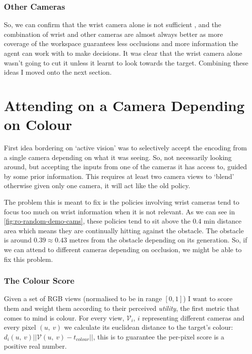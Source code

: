 \subsubsection{Other Cameras}
So, we can confirm that the wrist camera alone is not sufficient , and the combination of wrist and other cameras are almost always better as more coverage of the workspace guarantees less occlusions and more information the agent can work with to make decisions. It was clear that the wrist camera alone wasn't going to cut it unless it learnt to look towards the target. Combining these ideas I moved onto the next section.

\section{Attending on a Camera Depending on Colour}\label{sec:reach-obs-naive-cam-attn}
First idea bordering on `active vision' was to selectively accept the encoding from a single camera depending on what it was seeing. So, not necessarily looking around, but accepting the inputs from one of the cameras it has access to, guided by some prior information. This requires at least two camera views to `blend' otherwise given only one camera, it will act like the old policy.

The problem this is meant to fix is the policies involving wrist cameras tend to focus too much on wrist information when it is not relevant. As we can see in \ref{fig:ro-random-demo-cams}, these policies tend to sit above the $0.4$ min distance area which means they are continually hitting against the obstacle. The obstacle is around $0.39 \approx 0.43$ metres from the obstacle depending on its generation. So, if we can attend to different cameras depending on occlusion, we might be able to fix this problem.

\subsubsection{The Colour Score}
Given a set of RGB views (normalised to be  in range \(\left[0, 1\right]\)) I want to score them and weight them according to their perceived \emph{utility}, the first metric that comes to mind is colour. For every view, $\mathcal{V}_i$, $i$ representing different cameras and every pixel $\left( u, ~v\right)$ we calculate its euclidean distance to the target's colour: \( d_i\left(u, ~v\right)||\mathcal{V}\left(u, ~v\right) - t_{colour}||\), this is to guarantee the per-pixel score is a positive real number. 



